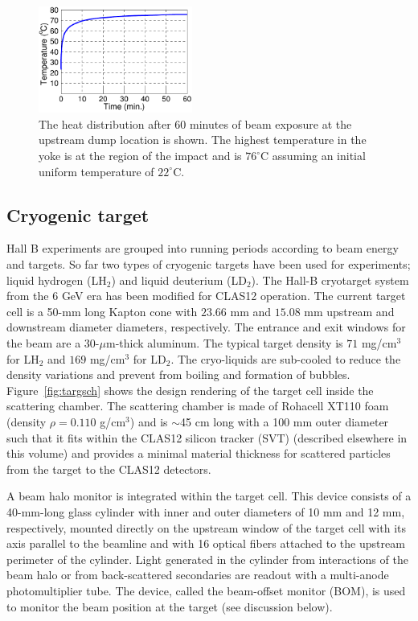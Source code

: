 \begin{figure}[hbt]
\begin{center}
\includegraphics[width=0.45\textwidth]{YokeHeating.pdf}
	\caption{The heat distribution after $60$ minutes of beam exposure at the upstream dump location is shown. The highest 
	temperature in the yoke is at the region of the impact and is $76^\circ$C assuming an initial uniform temperature of $22^\circ$C.}
\label{fig:ansys_yoke}
\end{center}
\end{figure}





\subsection{Cryogenic target}
\label{sec-cryotgt}

Hall B experiments are grouped into running periods according to beam energy and targets. So far two types of cryogenic targets have been 
used for experiments; liquid hydrogen (LH$_2$) and liquid deuterium (LD$_2$). The Hall-B cryotarget system from the $6$ GeV era  
\cite{CLAS} has been modified for CLAS12 operation.  The current target cell is a 50-mm long Kapton cone with $23.66$ mm and $15.08$ mm upstream and downstream diameter diameters, respectively. The entrance and exit windows for the beam are a 30-$\mu$m-thick aluminum. The typical target density is $71$ mg/cm$^3$ for LH$_2$ 
and $169$ mg/cm$^3$ for LD$_2$. The cryo-liquids are sub-cooled to reduce the density variations and prevent from boiling and formation of bubbles. Figure~\ref{fig:targsch} shows the design 
rendering of the target cell inside the scattering chamber.  The scattering chamber is made of Rohacell XT110 foam (density 
$\rho=0.110$ g/cm$^3$) and is $\sim$45 cm long with a 100 mm outer diameter such that it fits within the CLAS12 silicon tracker (SVT) 
(described elsewhere in this volume) and provides a minimal material thickness for scattered particles from the target to the CLAS12 detectors.  

A beam halo monitor is integrated within the target cell. This device consists of a 40-mm-long glass cylinder with inner and outer diameters 
of 10 mm and 12 mm, respectively, mounted directly on the upstream window of the target cell with its axis parallel to the beamline and 
with 16 optical fibers attached to the upstream perimeter of the cylinder. Light generated in the cylinder 
from interactions of the beam halo or from back-scattered secondaries are readout with a multi-anode photomultiplier tube. The device, called 
the  beam-offset monitor (BOM), is used to monitor the beam position at the target (see discussion below).  

